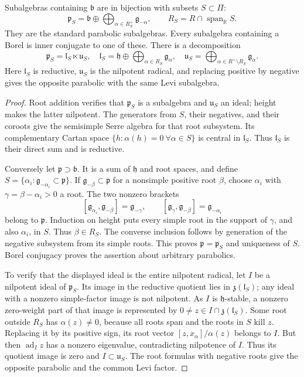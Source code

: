 \begin{theorem}\label{res:F07}
Subalgebras containing \(\mathfrak b\) are in bijection with
subsets \(S\subset\Pi\):
\[
 \mathfrak p_S=
 \mathfrak b\oplus\bigoplus_{\alpha\in R_S^+}
                       \mathfrak g_{-\alpha},
 \qquad R_S=R\cap\operatorname{span}_{\mathbb R}S .
\]
They are the standard parabolic subalgebras.
Every subalgebra containing a Borel is inner conjugate
to one of these. There is a decomposition
\[
 \mathfrak p_S=\mathfrak l_S\ltimes\mathfrak u_S,\quad
 \mathfrak l_S=\mathfrak h\oplus
                 \bigoplus_{\alpha\in R_S}\mathfrak g_\alpha,
 \quad
 \mathfrak u_S=\bigoplus_{\alpha\in R^+\setminus R_S}
                                       \mathfrak g_\alpha.
\]
Here \(\mathfrak l_S\) is reductive,
\(\mathfrak u_S\) is the nilpotent radical,
and replacing positive by negative gives the opposite
parabolic with the same Levi subalgebra.
\end{theorem}
\begin{proof}
Root addition verifies that \(\mathfrak p_S\) is a subalgebra
and \(\mathfrak u_S\) an ideal; height makes the latter
nilpotent. The generators from \(S\), their negatives,
and their coroots give the semisimple Serre algebra
for that root subsystem. Its complementary Cartan space
\(\{h:\alpha(h)=0\ \forall\alpha\in S\}\)
is central in \(\mathfrak l_S\). Thus \(\mathfrak l_S\)
is their direct sum and is reductive.

Conversely let \(\mathfrak p\supset\mathfrak b\).
It is a sum of \(\mathfrak h\) and root spaces, and define
\(S=\{\alpha_i:\mathfrak g_{-\alpha_i}\subset\mathfrak p\}\).
If \(\mathfrak g_{-\beta}\subset\mathfrak p\) for a nonsimple
positive root \(\beta\), choose \(\alpha_i\) with
\(\gamma=\beta-\alpha_i>0\) a root.
The two nonzero brackets
\[
 [\mathfrak g_{\alpha_i},\mathfrak g_{-\beta}]
       =\mathfrak g_{-\gamma},\qquad
 [\mathfrak g_\gamma,\mathfrak g_{-\beta}]
       =\mathfrak g_{-\alpha_i}
\]
belong to \(\mathfrak p\).
Induction on height puts every simple root in the support
of \(\gamma\), and also \(\alpha_i\), in \(S\).
Thus \(\beta\in R_S\).
The converse inclusion follows by generation of the
negative subsystem from its simple roots.
This proves \(\mathfrak p=\mathfrak p_S\) and uniqueness of \(S\).
Borel conjugacy proves the assertion about arbitrary parabolics.

To verify that the displayed ideal is the entire nilpotent
radical, let \(I\) be a nilpotent ideal of \(\mathfrak p_S\).
Its image in the reductive quotient lies in
\(\mathfrak z(\mathfrak l_S)\); any ideal with a nonzero
simple-factor image is not nilpotent.
As \(I\) is \(\mathfrak h\)-stable, a nonzero zero-weight
part of that image is represented by
\(0\ne z\in I\cap\mathfrak z(\mathfrak l_S)\).
Some root outside \(R_S\) has \(\alpha(z)\ne0\),
because all roots span and the roots in \(S\) kill \(z\).
Replacing it by its positive sign, its root vector
\([z,x_\alpha]/\alpha(z)\) belongs to \(I\).
But then \(\operatorname{ad}_I z\) has a nonzero eigenvalue,
contradicting nilpotence of \(I\).
Thus its quotient image is zero and \(I\subset\mathfrak u_S\).
The root formulas with negative roots give the opposite
parabolic and the common Levi factor.
\end{proof}

